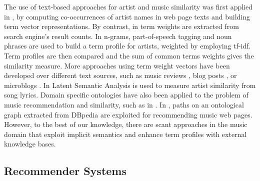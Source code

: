 The use of text-based approaches for artist and music similarity was first applied in \citep{Cohen2000}, by computing co-occurrences of artist names in web page texts and building term vector representations. By contrast, in \citep{Schedl2005} term weights are extracted from search engine's result counts. In \citep{Whitman2002} n-grams, part-of-speech tagging and noun phrases are used to build a term profile for artists, weighted by employing tf-idf. Term profiles are then compared and the sum of common terms weights gives the similarity measure. %
More approaches using term weight vectors have been developed over different text sources, such as music reviews \citep{Hu2005}, blog posts \citep{Celma2006}, or microblogs \citep{Schedl2013}.
In \citep{Logan2003} Latent Semantic Analysis is used to measure artist similarity from song lyrics. Domain specific ontologies have also been applied to the problem of music recommendation and similarity, such as in \citep{Celma2008}. In \citep{Leal2012}, paths on an ontological graph extracted from DBpedia are exploited for recommending music web pages. However, to the best of our knowledge, there are scant approaches in the music domain that exploit implicit semantics and enhance term profiles with external knowledge bases.


\subsection{Recommender Systems}
\label{sec:SOA:mir:recommendation}

